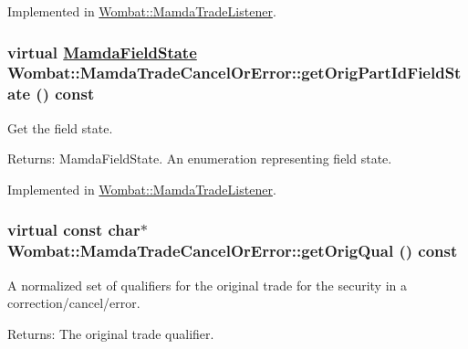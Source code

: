 Implemented in \hyperlink{classWombat_1_1MamdaTradeListener_473edf5c6bb8db20a5d2d57f503d7601}{Wombat::Mamda\-Trade\-Listener}.\hypertarget{classWombat_1_1MamdaTradeCancelOrError_0aa9f79553091ce4de69eb380be0f7b5}{
\subsubsection[getOrigPartIdFieldState]{\setlength{\rightskip}{0pt plus 5cm}virtual \hyperlink{namespaceWombat_93aac974f2ab713554fd12a1fa3b7d2a}{Mamda\-Field\-State} Wombat::Mamda\-Trade\-Cancel\-Or\-Error::get\-Orig\-Part\-Id\-Field\-State () const}}
\label{classWombat_1_1MamdaTradeCancelOrError_0aa9f79553091ce4de69eb380be0f7b5}


Get the field state. 

\begin{Desc}
\item[Returns:]Mamda\-Field\-State. An enumeration representing field state. \end{Desc}


Implemented in \hyperlink{classWombat_1_1MamdaTradeListener_5e083be5035140d2130f39d19ad79829}{Wombat::Mamda\-Trade\-Listener}.\hypertarget{classWombat_1_1MamdaTradeCancelOrError_970107e24e85f02515bc3d5ae182aafc}{
\subsubsection[getOrigQual]{\setlength{\rightskip}{0pt plus 5cm}virtual const char$\ast$ Wombat::Mamda\-Trade\-Cancel\-Or\-Error::get\-Orig\-Qual () const}}
\label{classWombat_1_1MamdaTradeCancelOrError_970107e24e85f02515bc3d5ae182aafc}


A normalized set of qualifiers for the original trade for the security in a correction/cancel/error. 

\begin{Desc}
\item[Returns:]The original trade qualifier. \end{Desc}


